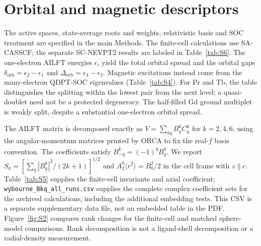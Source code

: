 \documentclass[11pt]{article}
\newcommand{\Atwo}{\ensuremath{A_2^0\langle r^2\rangle}}
\begin{document}
\section{Orbital and magnetic descriptors}
The active spaces, state-average roots and weights, relativistic basis and SOC treatment are specified in the main Methods. The finite-cell calculations use SA-CASSCF; the separate SC-NEVPT2 results are labeled in Table~\ref{tab:S6}. The one-electron AILFT energies $\epsilon_i$ yield the total orbital spread and the orbital gaps $\delta_{\mathrm{orb}}=\epsilon_2-\epsilon_1$ and $\Delta_{\mathrm{orb}}=\epsilon_3-\epsilon_2$. Magnetic excitations instead come from the many-electron QDPT-SOC eigenvalues (Table~\ref{tab:S4}). For Pr and Tb, the table distinguishes the splitting within the lowest pair from the next level; a quasi-doublet need not be a protected degeneracy. The half-filled Gd ground multiplet is weakly split, despite a substantial one-electron orbital spread.

The AILFT matrix is decomposed exactly as $V=\sum_{kq}B^k_qC^k_q$ for $k=2,4,6$, using the angular-momentum matrices printed by ORCA to fix the real-$f$ basis convention. The coefficients satisfy $B^k_{-q}=(-1)^q\overline{B^k_q}$. We report $S_k=[\sum_q|B^k_q|^2/(2k+1)]^{1/2}$ and $\Atwo=B^2_0/2$ in the cell frame with $z\parallel c$. Table~\ref{tab:S5} supplies the finite-cell invariants and axial coefficient; \texttt{wybourne\_Bkq\_all\_runs.csv} supplies the complete complex coefficient sets for the archived calculations, including the additional embedding tests. This CSV is a separate supplementary data file, not an embedded table in the PDF. Figure~\ref{fig:S2} compares rank changes for the finite-cell and matched sphere-model comparisons. Rank decomposition is not a ligand-shell decomposition or a radial-density measurement.
\end{document}
